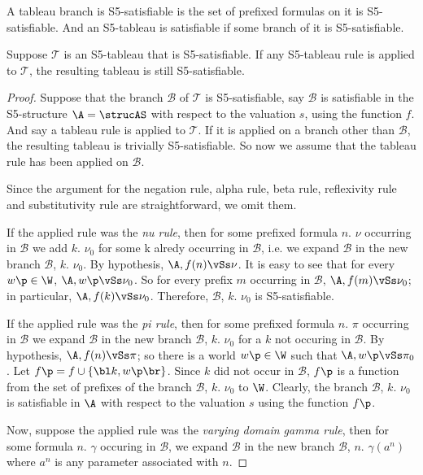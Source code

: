 \qquad A tableau branch is S5-satisfiable is the set of prefixed formulas on it is S5-satisfiable. And an S5-tableau is satisfiable if some branch of it is S5-satisfiable.



\begin{lema}
Suppose $\mathcal{T}$ is an S5-tableau that is S5-satisfiable. If any S5-tableau rule is applied to $\mathcal{T}$, the resulting tableau is still S5-satisfiable. 
\end{lema}

\begin{proof}
Suppose that the branch $\mathcal{B}$ of $\mathcal{T}$ is S5-satisfiable, say $\mathcal{B}$ is satisfiable in the S5-structure $\A = \strucAS$ with respect to the valuation $s$, using the function $f$. And say a tableau rule is applied to $\mathcal{T}$. If it is applied on a branch other than $\mathcal{B}$, the resulting tableau is trivially S5-satisfiable. So now we assume that the tableau   rule has been applied on $\mathcal{B}$. 

\qquad Since the argument for the negation rule, alpha rule, beta rule, reflexivity rule and substitutivity rule are straightforward, we omit them.  

\qquad If the applied rule was the \textit{nu rule}, then for some prefixed formula $n.$ $\nu$ occurring in $\mathcal{B}$ we add $k.$ $\nu_{0}$ for some k alredy occurring in $\mathcal{B}$, i.e. we expand $\mathcal{B}$ in the new branch $\mathcal{B}$, $k.$ $\nu_{0}$. By hypothesis, $\A, f(n) \vSs \nu$. It is easy to see that for every $w\p \in \W$, $\A, w\p \vSs \nu_{0}$. So for every prefix $m$ occurring in $\mathcal{B}$, $\A, f(m) \vSs \nu_{0}$; in particular, $\A, f(k) \vSs \nu_{0}$. Therefore, $\mathcal{B}$, $k.$ $\nu_{0}$ is S5-satisfiable. 


\qquad If the applied rule was the \textit{pi rule}, then for some prefixed formula $n.$ $\pi$ occurring in $\mathcal{B}$ we expand $\mathcal{B}$ in the new branch $\mathcal{B}$, $k.$ $\nu_{0}$ for a $k$ not occuring in $\mathcal{B}$. By hypothesis, $\A, f(n) \vSs \pi$; so there is a world $w\p \in \W$ such that $\A, w\p \vSs \pi_{0}$. Let $f\p = f \cup \{\bl k, w\p \br\}$. Since $k$ did not occur in $\mathcal{B}$, $f\p$ is a function from the set of prefixes of the branch $\mathcal{B}$, $k.$ $\nu_{0}$ to $\W$. Clearly, the branch $\mathcal{B}$, $k.$ $\nu_{0}$ is satisfiable in $\A$ with respect to the valuation $s$ using the function $f\p$.

\qquad Now, suppose the applied rule was the \textit{varying domain gamma rule}, then for some formula $n.$ $\gamma$ occuring in  $\mathcal{B}$, we expand $\mathcal{B}$ in the new branch $\mathcal{B}$, $n.$ $\gamma(a^{n})$ where $a^{n}$ is any parameter associated with $n$.


\end{proof}

